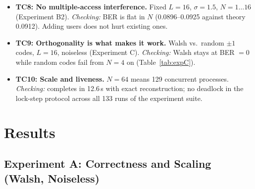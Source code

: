 \documentclass[11pt]{article}
\begin{document}
\begin{itemize}[leftmargin=1.6em]
  analytical $Q(0.5\sqrt{L}/\sigma)$ to within sampling error at every point
  (Table~\ref{tab:expB}).
  \item \textbf{TC8: No multiple-access interference.} Fixed $L=16$, $\sigma=1.5$,
  $N=1\ldots16$ (Experiment B2). \emph{Checking:} BER is flat in $N$ (0.0896--0.0925
  against theory 0.0912). Adding users does not hurt existing ones.
  \item \textbf{TC9: Orthogonality is what makes it work.} Walsh vs.\ random $\pm1$ codes,
  $L=16$, noiseless (Experiment C). \emph{Checking:} Walsh stays at BER $=0$ while random
  codes fail from $N=4$ on (Table~\ref{tab:expC}).
  \item \textbf{TC10: Scale and liveness.} $N=64$ means 129 concurrent processes.
  \emph{Checking:} completes in 12.6\,s with exact reconstruction; no deadlock in the
  lock-step protocol across all 133 runs of the experiment suite.
\end{itemize}

\section{Results}

\subsection{Experiment A: Correctness and Scaling (Walsh, Noiseless)}
\label{sec:expA}
\end{document}

